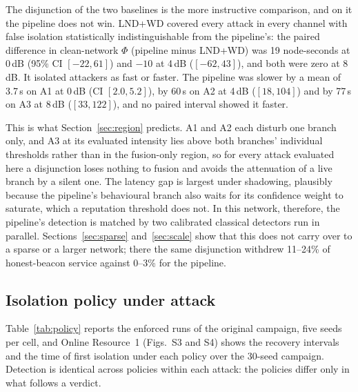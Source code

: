 \documentclass[pdflatex,sn-mathphys-num]{sn-jnl}%
\theoremstyle{thmstyleone}%
\theoremstyle{thmstyletwo}%
\theoremstyle{thmstylethree}%
\begin{document}
The disjunction of the two baselines is the more instructive comparison, and
on it the pipeline does not win. LND+WD covered every attack in every channel
with false isolation statistically indistinguishable from the pipeline's: the
paired difference in clean-network $\Phi$ (pipeline minus LND+WD) was 19
node-seconds at 0\,dB (95\% CI $[-22, 61]$) and $-10$ at 4\,dB ($[-62, 43]$),
and both were zero at 8\,dB. It isolated attackers as fast or faster. The
pipeline was slower by a mean of 3.7\,s on A1 at 0\,dB (CI $[2.0, 5.2]$), by
60\,s on A2 at 4\,dB ($[18, 104]$) and by 77\,s on A3 at 8\,dB ($[33, 122]$),
and no paired interval showed it faster.

This is what Section~\ref{sec:region} predicts. A1 and A2 each disturb one
branch only, and A3 at its evaluated intensity lies above both branches'
individual thresholds rather than in the fusion-only region, so for every
attack evaluated here a disjunction loses nothing to fusion and
avoids the attenuation of a live branch by a silent one. The latency gap is
largest under shadowing, plausibly because the pipeline's behavioural branch
also waits for its confidence weight to saturate, which a reputation
threshold does not. In this network, therefore, the pipeline's detection is
matched by two calibrated classical detectors run in parallel.
Sections~\ref{sec:sparse} and~\ref{sec:scale} show that this does not carry
over to a sparse or a larger network; there the same disjunction withdrew
11--24\% of honest-beacon service against 0--3\% for the pipeline.

\subsection{Isolation policy under attack}
\label{sec:policy}

Table~\ref{tab:policy} reports the enforced runs of
the original campaign, five seeds per cell, and Online Resource~1 (Figs.~S3 and S4)
shows the recovery intervals and the time
of first isolation under each policy over the 30-seed campaign. Detection is
identical across policies within each attack: the policies differ only in what
follows a verdict.
\end{document}
